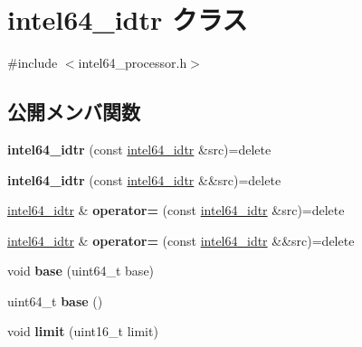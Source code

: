 \hypertarget{classintel64__idtr}{}\section{intel64\+\_\+idtr クラス}
\label{classintel64__idtr}


{\ttfamily \#include $<$intel64\+\_\+processor.\+h$>$}

\subsection*{公開メンバ関数}
\begin{DoxyCompactItemize}
\item 
\hypertarget{classintel64__idtr_a535cc4ec18b49a55074ffe2d0710f8dc}{}{\bfseries intel64\+\_\+idtr} (const \hyperlink{classintel64__idtr}{intel64\+\_\+idtr} \&src)=delete\label{classintel64__idtr_a535cc4ec18b49a55074ffe2d0710f8dc}

\item 
\hypertarget{classintel64__idtr_adab09df4fd85370a17c1d6076a4d4b0e}{}{\bfseries intel64\+\_\+idtr} (const \hyperlink{classintel64__idtr}{intel64\+\_\+idtr} \&\&src)=delete\label{classintel64__idtr_adab09df4fd85370a17c1d6076a4d4b0e}

\item 
\hypertarget{classintel64__idtr_a37c1a4964da1ffe04fc2235500d86a20}{}\hyperlink{classintel64__idtr}{intel64\+\_\+idtr} \& {\bfseries operator=} (const \hyperlink{classintel64__idtr}{intel64\+\_\+idtr} \&src)=delete\label{classintel64__idtr_a37c1a4964da1ffe04fc2235500d86a20}

\item 
\hypertarget{classintel64__idtr_af03603e60568900dd8006e18fa22069b}{}\hyperlink{classintel64__idtr}{intel64\+\_\+idtr} \& {\bfseries operator=} (const \hyperlink{classintel64__idtr}{intel64\+\_\+idtr} \&\&src)=delete\label{classintel64__idtr_af03603e60568900dd8006e18fa22069b}

\item 
\hypertarget{classintel64__idtr_abc6898b2813205ecde3b8fd81d809954}{}void {\bfseries base} (uint64\+\_\+t base)\label{classintel64__idtr_abc6898b2813205ecde3b8fd81d809954}

\item 
\hypertarget{classintel64__idtr_a2efd89debee1be01df7d8b3695ed4038}{}uint64\+\_\+t {\bfseries base} ()\label{classintel64__idtr_a2efd89debee1be01df7d8b3695ed4038}

\item 
\hypertarget{classintel64__idtr_a48f1dfe8e60abc3a68e841d7722b7238}{}void {\bfseries limit} (uint16\+\_\+t limit)\label{classintel64__idtr_a48f1dfe8e60abc3a68e841d7722b7238}


\end{DoxyCompactItemize}

